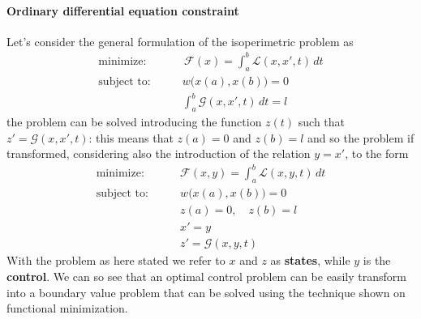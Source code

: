 	\paragraph{Ordinary differential equation constraint} Let's consider the general formulation of the isoperimetric problem as
	\begin{align*}
		\textrm{minimize:} \qquad & \, \mathcal F(x) = \int_a^b \mathcal L(x,x',t)\, dt \\
		\textrm{subject to:}\qquad & w\big(x(a),x(b) \big)= 0 \\
		& \int_a^b \mathcal G(x,x',t)\,dt = l
	\end{align*}
	the problem can be solved introducing the function $z(t)$ such that $z' = \mathcal G(x,x',t)$: this means that $z(a) = 0$ and $z(b) = l$ and so the problem if transformed, considering also the introduction of the relation $y = x'$, to the form
	\begin{align*}
		\textrm{minimize:} \qquad & \mathcal F(x,y) = \int_a^b \mathcal L(x,y,t)\, dt \\
		\textrm{subject to:}\qquad & w\big(x(a),x(b) \big)= 0 \\
		& z(a) = 0,\quad z(b) = l \\ & x' = y \\ & z' = \mathcal G(x,y,t)
	\end{align*}
	With the problem as here stated we refer to $x$ and $z$ as \textbf{states}, while $y$ is the \textbf{control}. We can so see that an optimal control problem can be easily transform into a boundary value problem that can be solved using the technique shown on functional minimization.
	 
